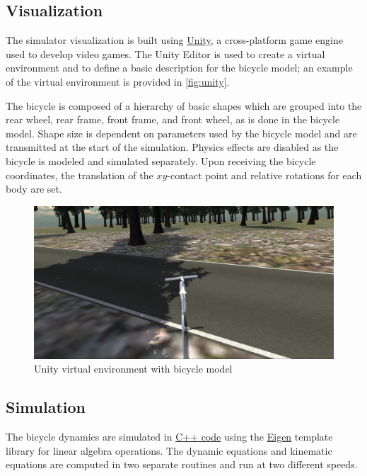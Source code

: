 \documentclass[11pt,a4paper,reqno]{amsart}
\begin{document}
\subsection{Visualization}
The simulator visualization is built using \href{https://unity3d.com/}{Unity}, a cross-platform game engine used to
develop video games.
The Unity Editor is used to create a virtual environment and to define a basic description for the bicycle model;
an example of the virtual environment is provided in \autoref{fig:unity}.

The bicycle is composed of a hierarchy of basic shapes which are grouped into the rear wheel, rear frame, front frame,
and front wheel, as is done in the bicycle model.
Shape size is dependent on parameters used by the bicycle model and are transmitted at the start of the simulation.
Physics effects are disabled as the bicycle is modeled and simulated separately.
Upon receiving the bicycle coordinates, the translation of the $ xy $-contact point and relative rotations for each body
are set.

\begin{figure}
    \centering
    \includegraphics[width=\textwidth]{screenshot_2015-06-27_19-31-15.png}
    \caption{Unity virtual environment with bicycle model}
    \label{fig:unity}
\end{figure}

\subsection{Simulation}
The bicycle dynamics are simulated in \href{https://github.com/oliverlee/bicycle}{C++ code} using the
\href{http://eigen.tuxfamily.org/index.php?title=Main_Page}{Eigen}\cite{eigenweb} template library for linear algebra
operations.
The dynamic equations and kinematic equations are computed in two separate routines and run at two different speeds.
\end{document}
